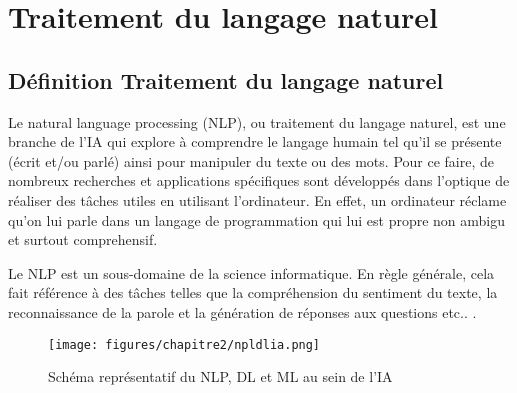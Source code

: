     


\section{Traitement du langage naturel}

    \subsection{Définition Traitement du langage naturel}
    \par Le natural language processing (NLP), ou traitement du langage naturel, est une branche de l'IA qui explore à comprendre le langage humain tel qu'il se présente (écrit et/ou parlé) ainsi pour manipuler du texte ou des mots. Pour ce faire, de nombreux recherches et applications spécifiques sont développés dans l'optique de réaliser des tâches utiles en utilisant l'ordinateur.
    En effet, un ordinateur réclame qu'on lui parle dans un langage de programmation qui lui est propre non ambigu et surtout comprehensif\cite{ch2ref8, ch2ref5}.  
    
    Le NLP est un sous-domaine de la science informatique. En règle générale, cela fait référence à des tâches telles que la compréhension du sentiment du texte, la reconnaissance de la parole et la génération de réponses aux questions etc.. \cite{ch2ref8, ch2ref5}.
    
    \begin{figure}[H]
    	\begin{center}
    		\texttt{[image: figures/chapitre2/npldlia.png]}
    	\end{center}
    	\caption {Schéma représentatif du NLP, DL et ML au sein de l'IA}
    	\label{fig:fig5ch2}
    \end{figure} 
    
    

